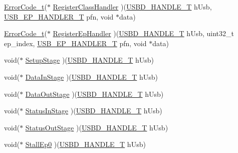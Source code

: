 \begin{DoxyCompactItemize}
\item 
\hyperlink{error_8h_a905255056c349318139d94aa4523d516}{Error\+Code\+\_\+t}($\ast$ \hyperlink{struct_u_s_b_d___c_o_r_e___a_p_i_abae19ffbccf70d251c1bdc64aefa3bc7}{Register\+Class\+Handler} )(\hyperlink{group___u_s_b_d___core_gafdbb2204d929cb9d75736bd2b42342ac}{U\+S\+B\+D\+\_\+\+H\+A\+N\+D\+L\+E\+\_\+T} h\+Usb, \hyperlink{group___u_s_b_d___core_gaa578d29a85226108ef62c6d5c325b742}{U\+S\+B\+\_\+\+E\+P\+\_\+\+H\+A\+N\+D\+L\+E\+R\+\_\+T} pfn, void $\ast$data)
\item 
\hyperlink{error_8h_a905255056c349318139d94aa4523d516}{Error\+Code\+\_\+t}($\ast$ \hyperlink{struct_u_s_b_d___c_o_r_e___a_p_i_aae115addea44c865ee6e474740a9cf80}{Register\+Ep\+Handler} )(\hyperlink{group___u_s_b_d___core_gafdbb2204d929cb9d75736bd2b42342ac}{U\+S\+B\+D\+\_\+\+H\+A\+N\+D\+L\+E\+\_\+T} h\+Usb, uint32\+\_\+t ep\+\_\+index, \hyperlink{group___u_s_b_d___core_gaa578d29a85226108ef62c6d5c325b742}{U\+S\+B\+\_\+\+E\+P\+\_\+\+H\+A\+N\+D\+L\+E\+R\+\_\+T} pfn, void $\ast$data)
\item 
void($\ast$ \hyperlink{struct_u_s_b_d___c_o_r_e___a_p_i_abf9196752dcf110a13c44a14b368e4be}{Setup\+Stage} )(\hyperlink{group___u_s_b_d___core_gafdbb2204d929cb9d75736bd2b42342ac}{U\+S\+B\+D\+\_\+\+H\+A\+N\+D\+L\+E\+\_\+T} h\+Usb)
\item 
void($\ast$ \hyperlink{struct_u_s_b_d___c_o_r_e___a_p_i_abe1068288a0eb073f7c9eee1466d4fae}{Data\+In\+Stage} )(\hyperlink{group___u_s_b_d___core_gafdbb2204d929cb9d75736bd2b42342ac}{U\+S\+B\+D\+\_\+\+H\+A\+N\+D\+L\+E\+\_\+T} h\+Usb)
\item 
void($\ast$ \hyperlink{struct_u_s_b_d___c_o_r_e___a_p_i_ac4232f616e5ec409d0ca853bf704175f}{Data\+Out\+Stage} )(\hyperlink{group___u_s_b_d___core_gafdbb2204d929cb9d75736bd2b42342ac}{U\+S\+B\+D\+\_\+\+H\+A\+N\+D\+L\+E\+\_\+T} h\+Usb)
\item 
void($\ast$ \hyperlink{struct_u_s_b_d___c_o_r_e___a_p_i_a9b57a8360ef4b3acd63ede5773813b36}{Status\+In\+Stage} )(\hyperlink{group___u_s_b_d___core_gafdbb2204d929cb9d75736bd2b42342ac}{U\+S\+B\+D\+\_\+\+H\+A\+N\+D\+L\+E\+\_\+T} h\+Usb)
\item 
void($\ast$ \hyperlink{struct_u_s_b_d___c_o_r_e___a_p_i_aefbfebfc97c53ff2d5030fdd44dbec7e}{Status\+Out\+Stage} )(\hyperlink{group___u_s_b_d___core_gafdbb2204d929cb9d75736bd2b42342ac}{U\+S\+B\+D\+\_\+\+H\+A\+N\+D\+L\+E\+\_\+T} h\+Usb)
\item 
void($\ast$ \hyperlink{struct_u_s_b_d___c_o_r_e___a_p_i_a8ee40b044bb1327607dbb4185b2b7c93}{Stall\+Ep0} )(\hyperlink{group___u_s_b_d___core_gafdbb2204d929cb9d75736bd2b42342ac}{U\+S\+B\+D\+\_\+\+H\+A\+N\+D\+L\+E\+\_\+T} h\+Usb)
\end{DoxyCompactItemize}


